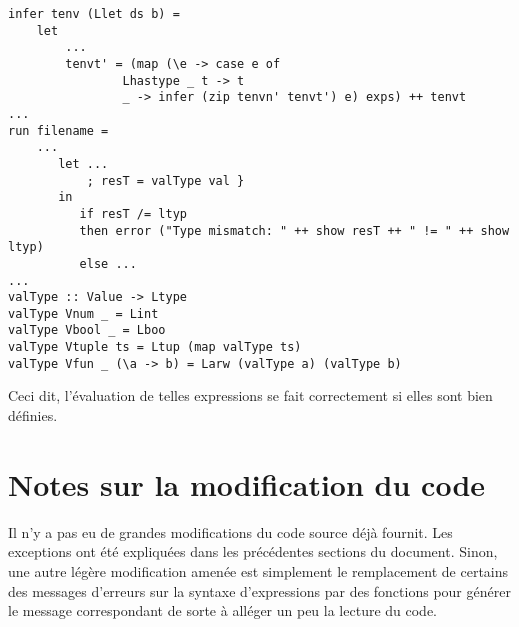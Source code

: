 \documentclass[10pt, titlepage]{article}
\begin{document}
\begin{lstlisting}
infer tenv (Llet ds b) =
    let
        ...
        tenvt' = (map (\e -> case e of
                Lhastype _ t -> t
                _ -> infer (zip tenvn' tenvt') e) exps) ++ tenvt
...
run filename =
    ...
       let ...
           ; resT = valType val }
       in 
          if resT /= ltyp
          then error ("Type mismatch: " ++ show resT ++ " != " ++ show ltyp)
          else ...
...
valType :: Value -> Ltype
valType Vnum _ = Lint
valType Vbool _ = Lboo
valType Vtuple ts = Ltup (map valType ts)
valType Vfun _ (\a -> b) = Larw (valType a) (valType b)
\end{lstlisting}
Ceci dit, l'évaluation de telles expressions se fait correctement si elles sont
bien définies.

\section{Notes sur la modification du code}

Il n'y a pas eu de grandes modifications du code source déjà fournit. Les
exceptions ont été expliquées dans les précédentes sections du document. Sinon,
une autre légère modification amenée est simplement le remplacement de certains
des messages d'erreurs sur la syntaxe d'expressions par des fonctions pour
générer le message correspondant de sorte à alléger un peu la lecture du code.
\end{document}
